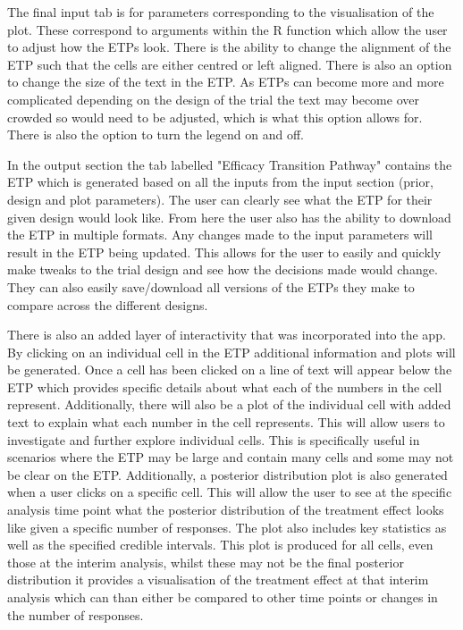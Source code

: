 The final input tab is for parameters corresponding to the visualisation of the plot. These correspond to arguments within the R function which allow the user to adjust how the ETPs look. There is the ability to change the alignment of the ETP such that the cells are either centred or left aligned. There is also an option to change the size of the text in the ETP. As ETPs can become more and more complicated depending on the design of the trial the text may become over crowded so would need to be adjusted, which is what this option allows for. There is also the option to turn the legend on and off. 

In the output section the tab labelled "Efficacy Transition Pathway" contains the ETP which is generated based on all the inputs from the input section (prior, design and plot parameters). The user can clearly see what the ETP for their given design would look like. From here the user also has the ability to download the ETP in multiple formats. Any changes made to the input parameters will result in the ETP being updated. This allows for the user to easily and quickly make tweaks to the trial design and see how the decisions made would change. They can also easily save/download all versions of the ETPs they make to compare across the different designs. 

There is also an added layer of interactivity that was incorporated into the app. By clicking on an individual cell in the ETP additional information and plots will be generated. Once a cell has been clicked on a line of text will appear below the ETP which provides specific details about what each of the numbers in the cell represent. Additionally, there will also be a plot of the individual cell with added text to explain what each number in the cell represents. This will allow users to investigate and further explore individual cells. This is specifically useful in scenarios where the ETP may be large and contain many cells and some may not be clear on the ETP. Additionally, a posterior distribution plot is also generated when a user clicks on a specific cell. This will allow the user to see at the specific analysis time point what the posterior distribution of the treatment effect looks like given a specific number of responses. The plot also includes key statistics as well as the specified credible intervals. This plot is produced for all cells, even those at the interim analysis, whilst these may not be the final posterior distribution it provides a visualisation of the treatment effect at that interim analysis which can than either be compared to other time points or changes in the number of responses. 

